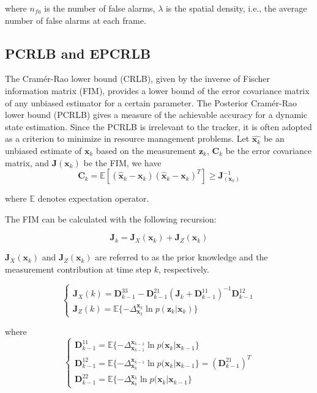 \documentclass[12pt,journal,draftclsnofoot,onecolumn]{IEEEtran}
\begin{document}
where $n_{fa}$ is the number of false alarms, $\lambda$ is the spatial density, i.e., the average number of false alarms at each frame.

\subsection{PCRLB and EPCRLB}
\label{sec:PCRLB}
The Cramér-Rao lower bound (CRLB), given by the inverse of Fischer information matrix (FIM), provides a lower bound of the error covariance matrix of any unbiased estimator for a certain parameter. The Posterior Cramér-Rao lower bound (PCRLB) gives a measure of the achievable accuracy for a dynamic state estimation. Since the PCRLB is irrelevant to the tracker, it is often adopted as a criterion to minimize in resource management problems. Let $\hat{\mathbf{x}_k}$ be an unbiased estimate of $\mathbf{x}_k$ based on the measurement $\mathbf{z}_k$, $\mathbf{C}_k$ be the error covariance matrix, and $\mathbf{J}(\mathbf{x}_k)$ be the FIM, we have 
\begin{equation}
    \mathbf{C}_k=\mathbb{E}[(\hat{\mathbf{x}}_k-\mathbf{x}_k)(\hat{\mathbf{x}}_k-\mathbf{x}_k)^{T}]\geq \mathbf{J}_(\mathbf{x}_k)^{-1}
\end{equation}

where $\mathbb{E}$ denotes expectation operator.

The FIM can be calculated with the following recursion\cite{tichavsky1998posterior}:

\begin{equation}
	\mathbf{J}_k=\mathbf{J}_X(\mathbf{x}_k)+\mathbf{J}_Z(\mathbf{x}_k)
	\label{J}
\end{equation}

$\mathbf{J}_X(\mathbf{x}_k)$ and $\mathbf{J}_Z(\mathbf{x}_k)$ are referred to as the prior knowledge and the measurement contribution at time step $k$, respectively.

\begin{equation}
	\begin{cases}
		\mathbf{J}_{X}(k)=\mathbf{D}_{k-1}^{33}-\mathbf{D}_{k-1}^{21}(\mathbf{J}_k+\mathbf{D}_{k-1}^{11})^{-1}\mathbf{D}_{k-1}^{12}\\
		\mathbf{J}_Z(k) =\mathbb{E}\{-\Delta _{\mathbf{x}_{k}}^{\mathbf{x}_{k}}\ln p(\mathbf{z}_k|\mathbf{x}_{k})\}
	\end{cases}    
\end{equation}

where
\begin{equation}
	\begin{cases}
		\mathbf{D}_{k-1}^{11}=\mathbb{E}\{-\Delta _{\mathbf{x}_{k-1}}^{\mathbf{x}_{k-1}}\ln p(\mathbf{x}_k|\mathbf{x}_{k-1}\}\\
		\mathbf{D}_{k-1}^{12}=\mathbb{E}\{-\Delta _{\mathbf{x}_{k}}^{\mathbf{x}_{k-1}}\ln p(\mathbf{x}_k|\mathbf{x}_{k-1}\}=(\mathbf{D}_{k-1}^{21})^T\\
		\mathbf{D}_{k-1}^{22}=\mathbb{E}\{-\Delta _{\mathbf{x}_{k}}^{\mathbf{x}_{k}}\ln p(\mathbf{x}_k|\mathbf{x}_{k-1}\}
	\end{cases}   
\end{equation}   
\end{document}
